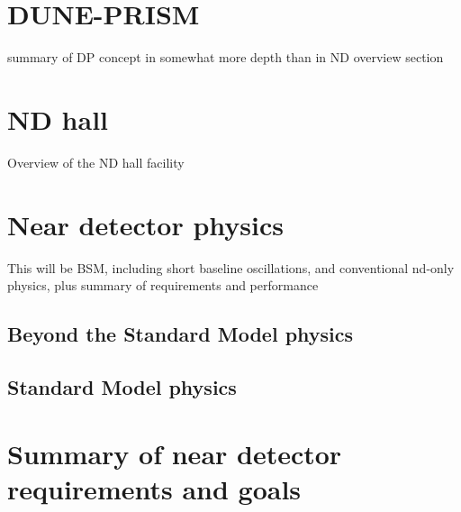 \section{DUNE-PRISM}
\label{sec:exsum-nd-DP}
%

summary of DP concept in somewhat more depth than in ND overview section

\section{ND hall}
\label{sec:exsum-nd-hall}
%

Overview of the ND hall facility





\section{Near detector physics}
\label{sec:exsum-nd-role-ndphysics}

This will be BSM, including short baseline oscillations, and conventional nd-only physics, plus summary of requirements and performance

\subsection{Beyond the Standard Model physics}
\label{ssec:exsum-nd-ndphys-bsm}

\subsection{Standard Model physics}
\label{sec:exsum-nd-ndphys-sm}

\section{Summary of near detector requirements and goals}
\label{sec:exsum-nd-requirements}
